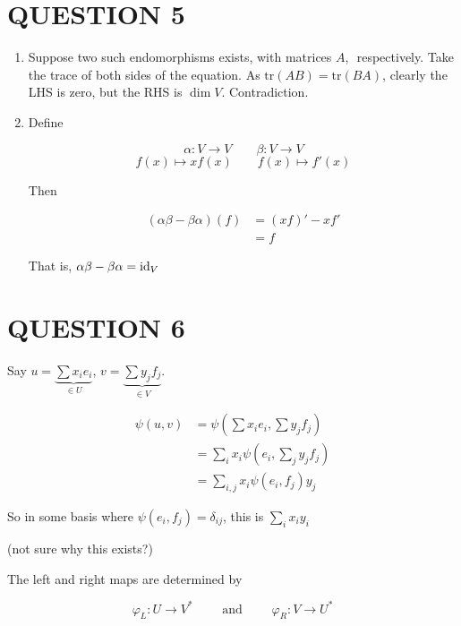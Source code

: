 \documentclass[a4paper]{article}
\begin{document}
\section{QUESTION 5}

\begin{enumerate} [label = (\alph*)]
	\item Suppose two such endomorphisms exists, with matrices $ A $, $  $ respectively. Take the trace of both sides of the equation. As $ \text{tr}(AB) = \text{tr}(BA)  $, clearly the LHS is zero, but the RHS is $ \dim V $. Contradiction. 
	
	\item Define
	
	\[ \alpha : V \to V \qquad \beta : V \to V \]
	\[ f(x) \mapsto xf(x) \qquad f(x) \mapsto f'(x) \]
	
	Then
	
	\begin{align*}
	(\alpha\beta - \beta \alpha)(f) & = (xf)'  - xf'  \\
	& = f
	\end{align*}
	
	That is, $ \alpha \beta- \beta \alpha = \operatorname{id}_{V} $
	
\end{enumerate}





\section{QUESTION 6}

Say $ u = \underbrace{\sum x_{i} e_{i}}_{\in U} $, $ v = \underbrace{  \sum  y_{j}f_{j}}_{\in V} $.

\begin{align*}
\psi(u,v) & = \psi \left(   \sum x_{i} e_{i},  \sum  y_{j}f_{j} \right)  \\
& = \sum_{i} x_{i} \psi \left(  e_{i}, \sum_{j} y_{j} f_{j}  \right) \\
& = \sum_{i,j} x_{i} \psi(e_{i},f_{j}) y_{j}
\end{align*}


So in some basis where $  \psi(e_{i},f_{j}) = \delta_{ij} $, this is $ \sum_{i} x_{i} y_{i} $

(not sure why this exists?)

The left and right maps are determined by

\[ \varphi_{L} : U \to V^{*} \qquad \text{ and } \qquad \varphi_{R} : V \to U^{*} \]
\end{document}
